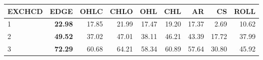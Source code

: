 \begin{table}[ht]
\centering
\begin{tabular}{lrrrrrrrr}
  \hline
EXCHCD & EDGE & OHLC & CHLO & OHL & CHL & AR & CS & ROLL \\ 
  \hline
1 & \textbf{22.98} & 17.85 & 21.99 & 17.47 & 19.20 & 17.37 & 2.69 & 10.62 \\ 
  2 & \textbf{49.52} & 37.02 & 47.01 & 38.11 & 46.21 & 43.39 & 17.72 & 37.99 \\ 
  3 & \textbf{72.29} & 60.68 & 64.21 & 58.34 & 60.89 & 57.64 & 30.80 & 45.92 \\ 
   \hline
\end{tabular}
\end{table}
